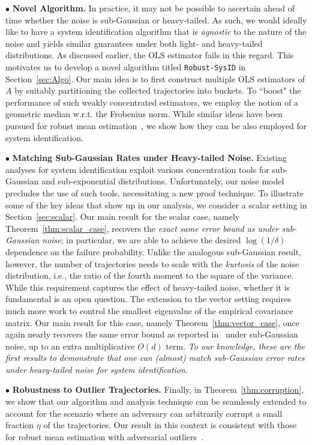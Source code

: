 \documentclass[letterpaper, 11 pt]{article}
\begin{document}
$\bullet$ \textbf{Novel Algorithm.} In practice, it may not be possible to ascertain ahead of time whether the noise is sub-Gaussian or heavy-tailed. As such, we would ideally like to have a system identification algorithm that is \emph{agnostic} to the nature of the noise and yields similar guarantees under both light- and heavy-tailed distributions. As discussed earlier, the OLS estimator fails in this regard. This motivates us to develop a novel algorithm titled \texttt{Robust-SysID} in Section~\ref{sec:Algo}. Our main idea is to first construct multiple OLS estimators of $A$ by suitably partitioning the collected trajectories into buckets. To ``boost" the performance of such weakly concentrated estimators, we employ the notion of a geometric median w.r.t. the Frobenius norm. While similar ideas have been pursued for robust mean estimation~\cite{minsker2015geometric}, we show how they can be also employed for system identification.  

$\bullet$ \textbf{Matching Sub-Gaussian Rates under Heavy-tailed Noise.} Existing analyses for system identification exploit various concentration tools for sub-Gaussian and sub-exponential distributions. Unfortunately, our noise model precludes the use of such tools, necessitating a new proof technique. To illustrate some of the key ideas that show up in our analysis, we consider a scalar setting in Section~\ref{sec:scalar}. Our main result for the scalar case, namely Theorem~\ref{thm:scalar_case}, recovers the \emph{exact same error bound as under sub-Gaussian noise}; in particular, we are able to achieve the desired $\log(1/\delta)$ dependence on the failure probability. Unlike the analogous sub-Gaussian result, however, the number of trajectories needs to scale with the \emph{kurtosis} of the noise distribution, i.e., the ratio of the fourth moment to the square of the variance. While this requirement captures the effect of heavy-tailed noise, whether it is fundamental is an open question. The extension to the vector setting requires much more work to control the smallest eigenvalue of the empirical covariance matrix. Our main result for this case, namely Theorem~\ref{thm:vector_case}, once again nearly recovers the same error bound as reported in~\cite{dean2020sample} under sub-Gaussian noise, up to an extra multiplicative $O(d)$ term. \emph{To our knowledge, these are the first results to demonstrate that one can (almost) match sub-Gaussian error rates under heavy-tailed noise for system identification.}  

$\bullet$ \textbf{Robustness to Outlier Trajectories.} Finally, in Theorem~\ref{thm:corruption}, we show that our algorithm and analysis technique can be seamlessly extended to account for the scenario where an adversary can arbitrarily corrupt a small fraction $\eta$ of the trajectories. Our result in this context is consistent with those for robust mean estimation with adversarial outliers~\cite{lugosi2021robust}. 
\end{document}

